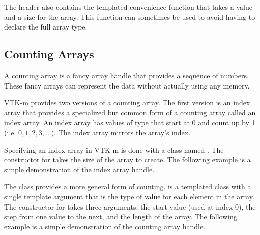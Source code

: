 
The  header also contains the
templated convenience function  that
takes a value and a size for the array. This function can sometimes be used
to avoid having to declare the full array type.



\subsection{Counting Arrays}
\label{sec:CountingArrays}


A counting array is a fancy array handle that provides a sequence of
numbers. These fancy arrays can represent the data without actually using
any memory.


VTK-m provides two versions of a counting array. The first version is an
index array that provides a specialized but common form of a counting array
called an index array. An index array has values of type  that
start at 0 and count up by 1 (i.e. $0, 1, 2, 3,\ldots$). The index array
mirrors the array's index.

Specifying an index array in VTK-m is done with a class named
. The constructor for
 takes the size of the array to create.
The following example is a simple demonstration of the index array handle.



The  class provides a more general form of
counting.  is a templated class with a
single template argument that is the type of value for each element in the
array. The constructor for  takes three
arguments: the start value (used at index 0), the step from one value to
the next, and the length of the array. The following example is a simple
demonstration of the counting array handle.

